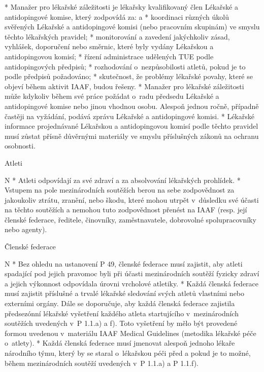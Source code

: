 * Manažer pro lékařské záležitosti je lékařsky kvalifikovaný člen Lékařské a antidopingové komise, který zodpovídá za:
  \begitems \style a
  * koordinaci různých úkolů svěřených Lékařské a antidopingové komisi (nebo pracovním skupinám) ve smyslu těchto lékařských pravidel;
  * monitorování a zavedení jakýchkoliv zásad, vyhlášek, doporučení nebo směrnic, které byly vydány Lékařskou a antidopingovou komisí;
  * řízení administrace udělených TUE podle antidopingových předpisů;
  * rozhodování o~nezpůsobilosti atletů, pokud je to podle předpisů požadováno;
  * skutečnost, že problémy lékařské povahy, které se objeví během aktivit IAAF, budou řešeny.
  \enditems
* Manažer pro lékařské záležitosti může kdykoliv během své práce požádat o~radu předsedu Lékařské a antidopingové komise nebo jinou vhodnou osobu. Alespoň jednou ročně, případně častěji na vyžádání, podává zprávu Lékařské a antidopingové komisi.
* Lékařské informace projednávané Lékařskou a antidopingovou komisí podle těchto pravidel musí zůstat přísně důvěrnými materiály ve smyslu příslušných zákonů na ochranu osobnosti.
\enditems

\secc Atleti

\begitems \style N
* Atleti odpovídají za své zdraví a za absolvování lékařských prohlídek.
* Vstupem na pole mezinárodních soutěžích berou na sebe zodpovědnost za jakoukoliv ztrátu, zranění, nebo škodu, které mohou utrpět v~důsledku své účasti na těchto soutěžích a nemohou tuto zodpovědnost přenést na IAAF (resp. její členské federace, ředitele, činovníky, zaměstnavatele, dobrovolné spolupracovníky nebo agenty).
\enditems

\secc Členské federace

\begitems \style N
* Bez ohledu na ustanovení P 49, členské federace musí zajistit, aby atleti spadající pod jejich pravomoc byli při účasti mezinárodních soutěží fyzicky zdraví a jejich výkonnost odpovídala úrovni vrcholové atletiky.
* Každá členská federace musí zajistit příslušné a trvalé lékařské sledování svých atletů vlastními nebo externími orgány. Dále se doporučuje, aby každá členská federace zajistila předsezónní lékařské vyšetření každého atleta startujícího v~mezinárodních soutěžích uvedených v~P 1.1.a) a f). Toto vyšetření by mělo být provedené formou uvedenou v~materiálu IAAF Medical Guidelines (metodika lékařské péče o~atlety).
* Každá členská federace musí jmenovat alespoň jednoho lékaře národního týmu, který by se staral o~lékařskou péči před a pokud je to možné, během mezinárodních soutěží uvedených v~P 1.1.a) a P 1.1.f).
\enditems

